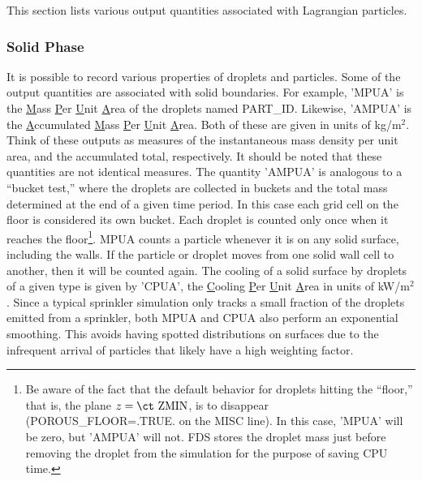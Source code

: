 \documentclass[11pt]{book}
\begin{document}
This section lists various output quantities associated with Lagrangian particles.

\subsubsection{Solid Phase}

It is possible to record various properties of droplets and particles. Some of the output quantities are associated with solid boundaries. For example,
{\ct 'MPUA'} is the \underline{M}ass \underline{P}er \underline{U}nit \underline{A}rea of the droplets named {\ct PART\_ID}.
Likewise, {\ct 'AMPUA'} is the \underline{A}ccumulated \underline{M}ass \underline{P}er \underline{U}nit \underline{A}rea.
Both of these are given in units of kg/m$^2$. Think of these outputs as measures of the instantaneous mass density per unit area,
and the accumulated total, respectively.  It should be noted that these quantities are not identical measures.  The quantity {\ct 'AMPUA'} is analogous to a ``bucket test,'' where the droplets are collected in buckets and the total mass determined at the end of a given time period.  In this case each grid cell on the floor is considered its own bucket.  Each droplet is counted only once when it reaches the floor\footnote{Be aware of the fact that the default behavior for droplets hitting the ``floor,'' that is, the plane $z=\hbox{\ct ZMIN}$, is to disappear ({\ct POROUS\_FLOOR=.TRUE.} on the {\ct MISC} line). In this case, {\ct 'MPUA'} will be zero, but {\ct 'AMPUA'} will not. FDS stores the droplet mass just before removing the droplet from the simulation for the purpose of saving CPU time.}. MPUA counts a particle whenever it is on any solid surface, including the walls.  If the particle or droplet moves from one solid wall
cell to another, then it will be counted again.  The cooling of a solid surface by droplets of a
given type is given by {\ct 'CPUA'}, the \underline{C}ooling \underline{P}er \underline{U}nit \underline{A}rea in units of kW/m$^2$.  Since a typical sprinkler simulation only tracks a small fraction of the droplets emitted from a sprinkler, both MPUA and CPUA also perform an exponential smoothing.  This avoids having spotted distributions on surfaces due to the infrequent arrival of particles that likely have a high weighting factor.
\end{document}
